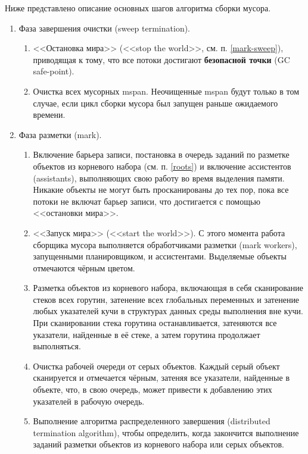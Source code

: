 Ниже представлено описание основных шагов алгоритма сборки мусора. \cite{golang_gc}

\begin{enumerate}[label*=\arabic*.]
	\item Фаза завершения очистки (sweep termination).
	\begin{enumerate}[label*=\arabic*.]
		\item <<Остановка мира>> (<<stop the world>>, см. п. \ref{mark-sweep}), приводящая к тому, что все потоки достигают \textbf{безопасной точки} (GC safe-point).
		\item Очистка всех мусорных mspan. Неочищенные mspan будут только в том случае, если цикл сборки мусора был запущен раньше ожидаемого времени.
	\end{enumerate}

	\item Фаза разметки (mark).
	\begin{enumerate}[label*=\arabic*.]
		\item Включение барьера записи, постановка в очередь заданий по разметке объектов из корневого набора (см. п. \ref{roots}) и включение ассистентов (assistants), выполняющих свою работу во время выделения памяти. Никакие объекты не могут быть просканированы до тех пор, пока все потоки не включат барьер записи, что достигается с помощью <<остановки мира>>.
		\item <<Запуск мира>> (<<start the world>>). С этого момента работа сборщика мусора выполняется обработчиками разметки (mark workers), запущенными планировщиком, и ассистентами. Выделяемые объекты отмечаются чёрным цветом.
		\item Разметка объектов из корневого набора, включающая в себя сканирование стеков всех горутин, затенение всех глобальных переменных и затенение любых указателей кучи в структурах данных среды выполнения вне кучи. При сканировании стека горутина останавливается, затеняются все указатели, найденные в её стеке, а затем горутина продолжает выполняться.
		\item Очистка рабочей очереди от серых объектов. Каждый серый объект сканируется и отмечается чёрным, затеняя все указатели, найденные в объекте, что, в свою очередь, может привести к добавлению этих указателей в рабочую очередь.
		\item Выполнение алгоритма распределенного завершения (distributed termination algorithm), чтобы определить, когда закончится выполнение заданий разметки объектов из корневого набора или серых объектов.
	\end{enumerate}


\end{enumerate}
